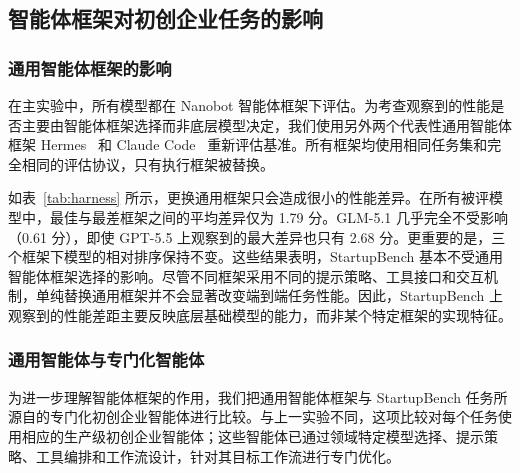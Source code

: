 \subsection{智能体框架对初创企业任务的影响}

\subsubsection{通用智能体框架的影响}
\begin{table}[t]
\centering
\small
\renewcommand{\arraystretch}{1.15}
\caption{不同通用智能体框架下的性能。对每个模型，我们报告三个通用框架下的平均分，以及框架间性能极差（最大值减最小值）。}
\label{tab:harness}
\end{table}

在主实验中，所有模型都在 Nanobot 智能体框架下评估。为考查观察到的性能是否主要由智能体框架选择而非底层模型决定，我们使用另外两个代表性通用智能体框架 Hermes~\cite{hermes_agent} 和 Claude Code~\cite{anthropic_claude_code} 重新评估基准。所有框架均使用相同任务集和完全相同的评估协议，只有执行框架被替换。

如表~\ref{tab:harness} 所示，更换通用框架只会造成很小的性能差异。在所有被评模型中，最佳与最差框架之间的平均差异仅为 1.79 分。GLM-5.1 几乎完全不受影响（0.61 分），即使 GPT-5.5 上观察到的最大差异也只有 2.68 分。更重要的是，三个框架下模型的相对排序保持不变。这些结果表明，StartupBench 基本不受通用智能体框架选择的影响。尽管不同框架采用不同的提示策略、工具接口和交互机制，单纯替换通用框架并不会显著改变端到端任务性能。因此，StartupBench 上观察到的性能差距主要反映底层基础模型的能力，而非某个特定框架的实现特征。

\subsubsection{通用智能体与专门化智能体}
为进一步理解智能体框架的作用，我们把通用智能体框架与 StartupBench 任务所源自的专门化初创企业智能体进行比较。与上一实验不同，这项比较对每个任务使用相应的生产级初创企业智能体；这些智能体已通过领域特定模型选择、提示策略、工具编排和工作流设计，针对其目标工作流进行专门优化。


